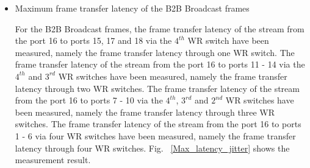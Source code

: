 \begin{itemize}
For the B2B Unicast frames, the maximum frame transfer latency of \SI{23}{\us} from the port 17 to the port 1 through four WR switches has been measured, see Fig. ~\ref{Max_latency_jitter_unicast}. 

%
%

\begin{figure}[H]
   \centering   
   \texttt{[image: Max\_latency\_jitter\_unicast.png]}
   \caption{Maximum frame transfer latency for B2B Unicast frames.}
   \label{Max_latency_jitter_unicast}
\end{figure}

    \item Maximum frame transfer latency of the B2B Broadcast frames

For the B2B Broadcast frames, the frame transfer latency of the stream from the port 16 to ports 15, 17 and 18 via the $4^{th}$ WR switch have been measured, namely the frame transfer latency through one WR switch. The frame transfer latency of the stream from the port 16 to ports 11 - 14 via the $4^{th}$ and $3^{rd}$ WR switches have been measured, namely the frame transfer latency through two WR switches. The frame transfer latency of the stream from the port 16 to ports 7 - 10 via the $4^{th}$, $3^{rd}$ and $2^{nd}$ WR switches have been measured, namely the frame transfer latency through three WR switches. The frame transfer latency of the stream from the port 16 to ports 1 - 6 via four WR switches have been measured, namely the frame transfer latency through four WR switches. Fig. ~\ref{Max_latency_jitter} shows the measurement result.
  

\end{itemize}
